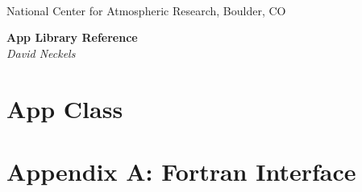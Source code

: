 \documentclass[]{article}
\begin{document}

\begin{titlepage}

\begin{latexonly}
 \\
\noindent National Center for Atmospheric Research, Boulder, CO \\
\vspace{2in}
\end{latexonly}

\begin{center}
{\Large\bf App Library Reference} \\
{\it David Neckels}
\end{center}

\end{titlepage}

\tableofcontents

\newpage


%

\section{App Class}



%



% 
%

\setcounter{section}{1}

\section*{Appendix A:  Fortran Interface}


\end{document}
